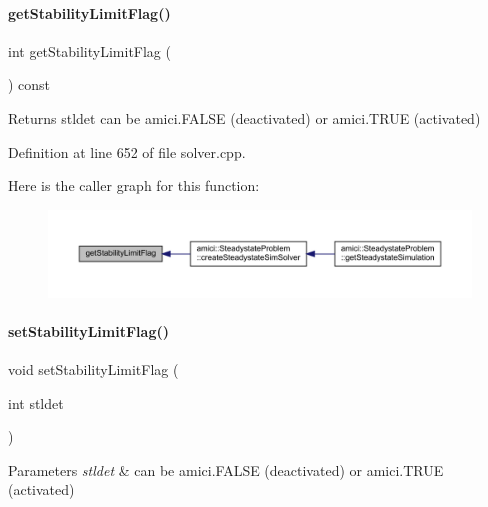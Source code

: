 \paragraph{\texorpdfstring{get\+Stability\+Limit\+Flag()}{getStabilityLimitFlag()}}
{\footnotesize\ttfamily int get\+Stability\+Limit\+Flag (\begin{DoxyParamCaption}{ }\end{DoxyParamCaption}) const}

\begin{DoxyReturn}{Returns}
stldet can be amici.\+F\+A\+L\+SE (deactivated) or amici.\+T\+R\+UE (activated) 
\end{DoxyReturn}


Definition at line 652 of file solver.\+cpp.

Here is the caller graph for this function\+:
\nopagebreak
\begin{figure}[H]
\begin{center}
\leavevmode
\includegraphics[width=350pt]{classamici_1_1_solver_ae1e9c3c5e59413ae25fb67c29983e3f3_icgraph}
\end{center}
\end{figure}
\mbox{\label{classamici_1_1_solver_afdf072c35ae67261f8106e8bf6b4a44a}} 
\paragraph{\texorpdfstring{set\+Stability\+Limit\+Flag()}{setStabilityLimitFlag()}}
{\footnotesize\ttfamily void set\+Stability\+Limit\+Flag (\begin{DoxyParamCaption}\item[{int}]{stldet }\end{DoxyParamCaption})}


\begin{DoxyParams}{Parameters}
{\em stldet} & can be amici.\+F\+A\+L\+SE (deactivated) or amici.\+T\+R\+UE (activated) \\
\hline
\end{DoxyParams}


